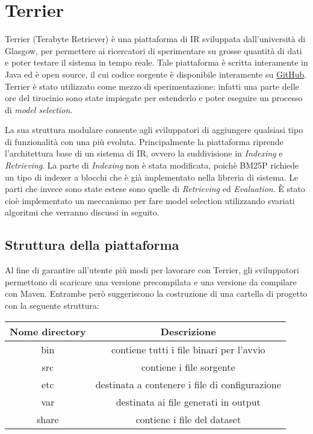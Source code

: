 \chapter{Terrier}
Terrier (Terabyte Retriever) è una piattaforma di IR sviluppata dall'università di Glasgow, per permettere ai ricercatori di sperimentare su
grosse quantità di dati e poter testare il sistema in tempo reale.
Tale piattaforma è scritta interamente in Java ed è open source, il cui codice sorgente è disponibile
interamente su \href{https://github.com/terrier-org/terrier-core}{GitHub}.
\\
Terrier è stato utilizzato come mezzo di sperimentazione: infatti
una parte delle ore del tirocinio sono state impiegate per estenderlo e poter eseguire un processo
di \textit{model selection}.

La sua struttura modulare consente agli sviluppatori di aggiungere qualsiasi tipo di funzionalità con una
più evoluta.
Principalmente la piattaforma riprende l'architettura base di un sistema di IR, ovvero la suddivisione in
\textit{Indexing} e \textit{Retrieving}. La parte di \textit{Indexing} non è stata modificata, poichè
BM25P richiede un tipo di indexer a blocchi che è già implementato nella libreria di sistema.
Le parti che invece sono state estese sono quelle di \textit{Retrieving} ed \textit{Evaluation}. 
\`E stato cioè implementato un meccanismo per fare model selection utilizzando svariati algoritmi
che verranno discussi in seguito.

\section{Struttura della piattaforma}
Al fine di garantire all'utente più modi per lavorare con Terrier, gli sviluppatori
permettono di scaricare una versione precompilata e una versione da compilare con
Maven. Entrambe però suggeriscono la costruzione
di una cartella di progetto con la seguente struttura:

\pagebreak

\begin{table}[h]
	\centering
	\begin{tabular}{|c|c|}
		\hline
		\textbf{Nome directory} & \textbf{Descrizione} \\
		\hline
		bin & contiene tutti i file binari per l'avvio \\
		\hline
		src & contiene i file sorgente \\
		\hline
		etc & destinata a contenere i file di configurazione \\
		\hline
		var & destinata ai file generati in output \\
		\hline
		share & contiene i file del dataset \\
		\hline
	\end{tabular}
\end{table}

